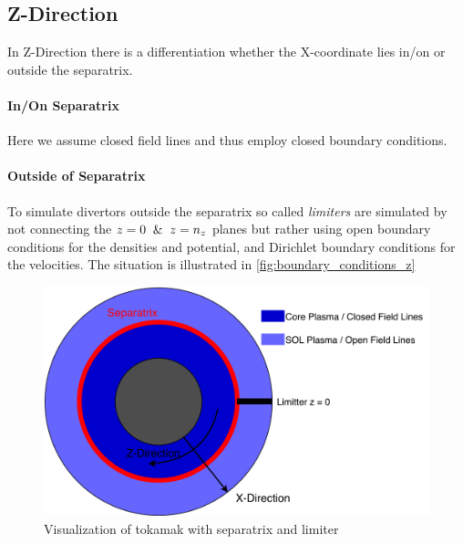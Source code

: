 \documentclass[master.tex]{subfiles}
\begin{document}
\subsection{Z-Direction}
In Z-Direction there is a differentiation whether the X-coordinate lies in/on or outside the separatrix.
\paragraph{In/On Separatrix}
Here we assume closed field lines and thus employ closed boundary conditions.
\paragraph{Outside of Separatrix}
To simulate  divertors outside the separatrix so called \textit{limiters} are simulated by not connecting the $z=0 \And z=n_z$ planes but rather using open boundary conditions for the densities and potential, and Dirichlet boundary conditions for the velocities. The situation is illustrated in \autoref{fig:boundary_conditions_z}
\begin{figure}[ht]
    \centering
    \includegraphics[width=\linewidth]{pdfs/boundary_conditions_z.pdf}
    \caption{Visualization of tokamak with separatrix and limiter}
    \label{fig:boundary_conditions_z}
\end{figure}
\end{document}
